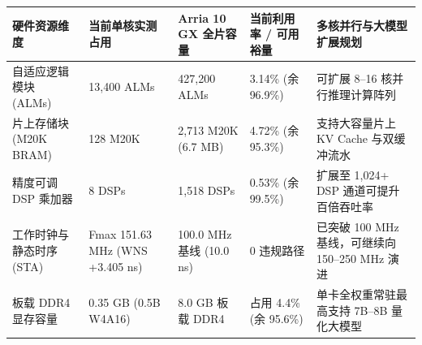 \documentclass[11pt,a4paper]{article}
\begin{document}
{\footnotesize\renewcommand{\arraystretch}{1.14}\begin{longtable}{@{}L{0.19\textwidth}L{0.16\textwidth}L{0.16\textwidth}L{0.15\textwidth}L{0.24\textwidth}@{}}\toprule

\textbf{硬件资源维度} & \textbf{当前单核实测占用} & \textbf{Arria 10 GX 全片容量} & \textbf{当前利用率 /\allowbreak{} 可用裕量} & \textbf{多核并行与大模型扩展规划}\\\midrule\endhead

自适应逻辑模块 (\allowbreak{}ALMs)\allowbreak{} & 13,\allowbreak{}400 ALMs & 427,\allowbreak{}200 ALMs & 3.14\% (\allowbreak{}余 96.9\%)\allowbreak{} & 可扩展 8–16 核并行推理计算阵列\\[2pt]

片上存储块 (\allowbreak{}M20K BRAM)\allowbreak{} & 128 M20K & 2,\allowbreak{}713 M20K (\allowbreak{}6.7 MB)\allowbreak{} & 4.72\% (\allowbreak{}余 95.3\%)\allowbreak{} & 支持大容量片上 KV Cache 与双缓冲流水\\[2pt]

精度可调 DSP 乘加器 & 8 DSPs & 1,\allowbreak{}518 DSPs & 0.53\% (\allowbreak{}余 99.5\%)\allowbreak{} & 扩展至 1,\allowbreak{}024+\allowbreak{} DSP 通道可提升百倍吞吐率\\[2pt]

工作时钟与静态时序 (\allowbreak{}STA)\allowbreak{} & Fmax 151.63 MHz (\allowbreak{}WNS +\allowbreak{}3.405 ns)\allowbreak{} & 100.0 MHz 基线 (\allowbreak{}10.0 ns)\allowbreak{} & 0 违规路径 & 已突破 100 MHz 基线，可继续向 150–250 MHz 演进\\[2pt]

板载 DDR4 显存容量 & 0.35 GB (\allowbreak{}0.5B W4A16)\allowbreak{} & 8.0 GB 板载 DDR4 & 占用 4.4\% (\allowbreak{}余 95.6\%)\allowbreak{} & 单卡全权重常驻最高支持 7B–8B 量化大模型\\[2pt]

\bottomrule\end{longtable}}
\end{document}

